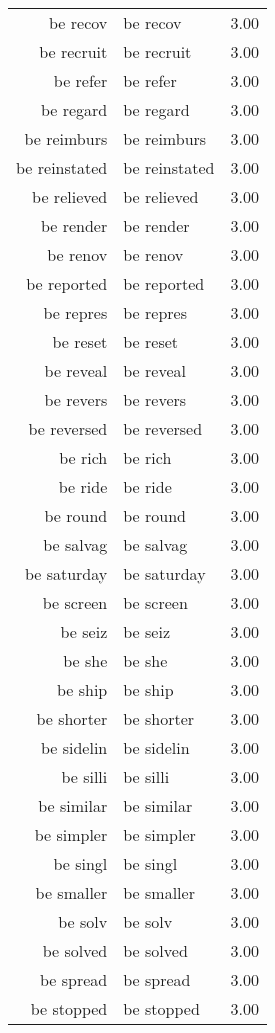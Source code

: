 \begin{table}[ht]
\begin{tabular}{rlr}
  be recov & be recov & 3.00 \\ 
  be recruit & be recruit & 3.00 \\ 
  be refer & be refer & 3.00 \\ 
  be regard & be regard & 3.00 \\ 
  be reimburs & be reimburs & 3.00 \\ 
  be reinstated & be reinstated & 3.00 \\ 
  be relieved & be relieved & 3.00 \\ 
  be render & be render & 3.00 \\ 
  be renov & be renov & 3.00 \\ 
  be reported & be reported & 3.00 \\ 
  be repres & be repres & 3.00 \\ 
  be reset & be reset & 3.00 \\ 
  be reveal & be reveal & 3.00 \\ 
  be revers & be revers & 3.00 \\ 
  be reversed & be reversed & 3.00 \\ 
  be rich & be rich & 3.00 \\ 
  be ride & be ride & 3.00 \\ 
  be round & be round & 3.00 \\ 
  be salvag & be salvag & 3.00 \\ 
  be saturday & be saturday & 3.00 \\ 
  be screen & be screen & 3.00 \\ 
  be seiz & be seiz & 3.00 \\ 
  be she & be she & 3.00 \\ 
  be ship & be ship & 3.00 \\ 
  be shorter & be shorter & 3.00 \\ 
  be sidelin & be sidelin & 3.00 \\ 
  be silli & be silli & 3.00 \\ 
  be similar & be similar & 3.00 \\ 
  be simpler & be simpler & 3.00 \\ 
  be singl & be singl & 3.00 \\ 
  be smaller & be smaller & 3.00 \\ 
  be solv & be solv & 3.00 \\ 
  be solved & be solved & 3.00 \\ 
  be spread & be spread & 3.00 \\ 
  be stopped & be stopped & 3.00 \\ 

\end{tabular}
\end{table}

